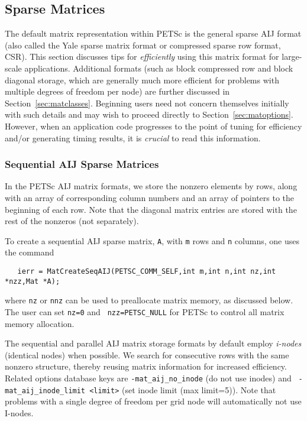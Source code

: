 \subsection{Sparse Matrices}
\label{sec:matsparse}

The default matrix representation within PETSc is the general sparse 
AIJ format (also called the Yale sparse matrix format or compressed
sparse row format, CSR).  This section discusses tips for {\em efficiently}
using this matrix format for large-scale applications. Additional
formats (such as block compressed row and block diagonal storage,
which are generally much more efficient for problems with multiple
degrees of freedom per node) are further discussed in
Section~\ref{sec:matclasses}.  Beginning users need not concern
themselves initially with such details and may wish to proceed
directly to Section~\ref{sec:matoptions}.  However, when an
application code progresses to the point of tuning for efficiency
and/or generating timing results, it is {\em crucial} to read this
information.

\subsubsection{Sequential AIJ Sparse Matrices}

In the PETSc AIJ matrix formats, we store the nonzero elements
by rows, along with an array of corresponding column numbers and
an array of pointers to the beginning of each row.  Note that the
diagonal matrix entries are stored with the rest of the nonzeros (not
separately). 

To create a sequential AIJ sparse matrix, {\tt A}, 
 with {\tt m} rows and {\tt n} columns,
one uses the command
\begin{verbatim}
   ierr = MatCreateSeqAIJ(PETSC_COMM_SELF,int m,int n,int nz,int *nzz,Mat *A);
\end{verbatim}
where {\tt nz} or {\tt nnz} can be used to preallocate matrix memory,
as discussed below. The user can set {\tt nz=0} and {\tt
nzz=PETSC\_NULL} for PETSc to control all matrix memory allocation.

The sequential and parallel AIJ matrix storage formats by default
employ {\em i-nodes} (identical nodes) when possible.  We search for
consecutive rows with the same nonzero structure, thereby reusing
matrix information for increased efficiency.  Related options database
keys are {\tt -mat\_aij\_no\_inode} (do not use inodes) and {\tt
-mat\_aij\_inode\_limit <limit>} (set inode limit (max limit=5)).
Note that problems with a single degree of freedom per grid node
will automatically not use I-nodes.

